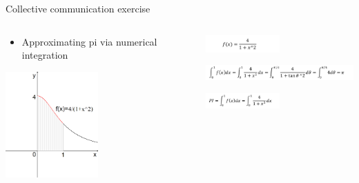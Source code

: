 \begin{frame}[fragile]{Collective communication exercise}

\begin{columns}
\begin{column}{0.5\textwidth}
\begin{itemize}
\item Approximating pi via numerical integration
\end{itemize}

\begin{center}
     \includegraphics[width=0.5\textwidth]{img/piFunction.png}
     \end{center}
\end{column}

\begin{column}{0.5\textwidth}  %
    \begin{center}
     \includegraphics[width=0.5\textwidth]{img/formula_a.png}
     \end{center}
     \vspace{5mm}
     \begin{center}
     \includegraphics[width=1.0\textwidth]{img/formula_b.png}
     \end{center}
      \vspace{5mm}
     \begin{center}
     \includegraphics[width=0.5\textwidth]{img/formula_c.png}
     \end{center}
\end{column}
\end{columns}




\end{frame}

